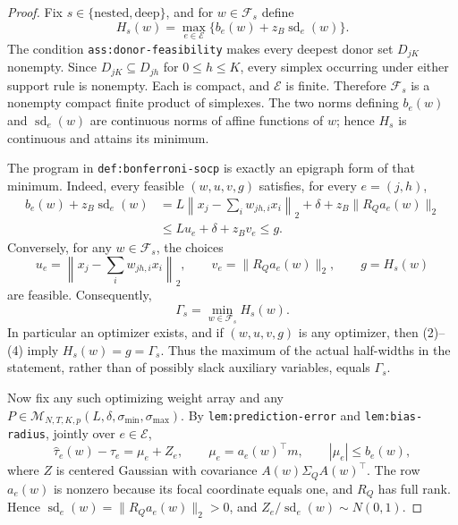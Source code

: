\documentclass{article}
\begin{document}
\begin{proof}
Fix \(s\in\{\mathrm{nested},\mathrm{deep}\}\), and for
\(w\in\mathcal F_s\) define
\[
 H_s(w)=\max_{e\in\mathcal E}
 \{b_e(w)+z_B\operatorname{sd}_e(w)\}.
 \tag{1}
\]
The condition \texttt{ass:donor-feasibility} makes every deepest donor set
\(D_{jK}\) nonempty.  Since \(D_{jK}\subseteq D_{jh}\) for
\(0\leq h\leq K\), every simplex occurring under either support rule is
nonempty.  Each is compact, and \(\mathcal E\) is finite.  Therefore
\(\mathcal F_s\) is a nonempty compact finite product of simplexes.  The
two norms defining \(b_e(w)\) and \(\operatorname{sd}_e(w)\) are continuous
norms of affine functions of \(w\); hence \(H_s\) is continuous and attains
its minimum.

The program in \texttt{def:bonferroni-socp} is exactly an epigraph form of
that minimum.  Indeed, every feasible \((w,u,v,g)\) satisfies, for every
\(e=(j,h)\),
\[
\begin{aligned}
 b_e(w)+z_B\operatorname{sd}_e(w)
 &=L\left\lVert x_j-\sum_iw_{jh,i}x_i\right\rVert_2+
   \delta+z_B\lVert R_Qa_e(w)\rVert_2\\
 &\leq Lu_e+\delta+z_Bv_e
 \leq g.
\end{aligned}
\tag{2}
\]
Conversely, for any \(w\in\mathcal F_s\), the choices
\[
 u_e=\left\lVert x_j-\sum_iw_{jh,i}x_i\right\rVert_2,
 \qquad
 v_e=\lVert R_Qa_e(w)\rVert_2,
 \qquad
 g=H_s(w)
 \tag{3}
\]
are feasible.  Consequently,
\[
 \Gamma_s=\min_{w\in\mathcal F_s}H_s(w).
 \tag{4}
\]
In particular an optimizer exists, and if \((w,u,v,g)\) is any optimizer,
then (2)--(4) imply \(H_s(w)=g=\Gamma_s\).  Thus the maximum of the actual
half-widths in the statement, rather than of possibly slack auxiliary
variables, equals \(\Gamma_s\).

Now fix any such optimizing weight array and any
\(P\in\mathcal M_{N,T,K,p}(L,\delta,\sigma_{\min},\sigma_{\max})\).
By \texttt{lem:prediction-error} and \texttt{lem:bias-radius}, jointly over
\(e\in\mathcal E\),
\[
 \widehat\tau_e(w)-\tau_e=\mu_e+Z_e,
 \qquad
 \mu_e=a_e(w)^{\top}m,
 \qquad
 |\mu_e|\leq b_e(w),
 \tag{5}
\]
where \(Z\) is centered Gaussian with covariance
\(A(w)\Sigma_QA(w)^{\top}\).  The row \(a_e(w)\) is nonzero because its
focal coordinate equals one, and \(R_Q\) has full rank.  Hence
\(\operatorname{sd}_e(w)=\lVert R_Qa_e(w)\rVert_2>0\), and
\(Z_e/\operatorname{sd}_e(w)\sim N(0,1)\).


\end{proof}
\end{document}
